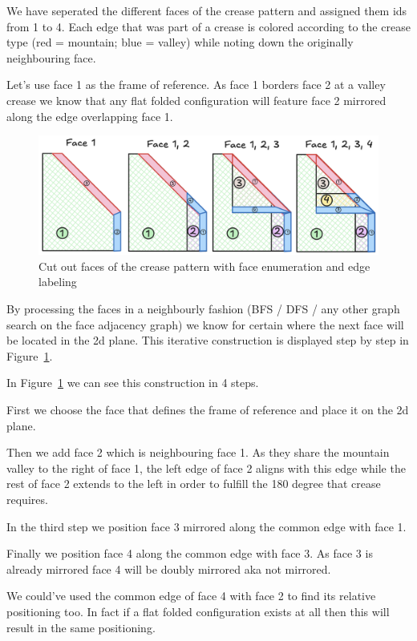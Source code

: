 We have seperated the different faces of the crease pattern and assigned them ids from 1 to 4.
Each edge that was part of a crease is colored according to the crease type (red = mountain; blue = valley) while noting down the originally neighbouring face.

Let's use face 1 as the frame of reference.
As face 1 borders face 2 at a valley crease we know that any flat folded configuration will feature face 2 mirrored along the edge overlapping face 1.

\begin{figure}[h]
\centering
\includegraphics[width=\textwidth]{assets/demo_localflatfold.png}
\caption{Cut out faces of the crease pattern with face enumeration and edge labeling}
\label{fig:demo_localflatfold}
\end{figure}

By processing the faces in a neighbourly fashion (BFS / DFS / any other graph search on the face adjacency graph)
we know for certain where the next face will be located in the 2d plane.
This iterative construction is displayed step by step in Figure~\ref{fig:demo_localflatfold}.

In Figure~\ref{fig:demo_localflatfold} we can see this construction in 4 steps.

First we choose the face that defines the frame of reference and place it on the 2d plane.

Then we add face 2 which is neighbouring face 1. As they share the mountain valley to the right of face 1, the left edge
of face 2 aligns with this edge while the rest of face 2 extends to the left in order to fulfill the 180 degree that crease requires.

In the third step we position face 3 mirrored along the common edge with face 1.

Finally we position face 4 along the common edge with face 3.
As face 3 is already mirrored face 4 will be doubly mirrored aka not mirrored.

We could've used the common edge of face 4 with face 2 to find its relative positioning too.
In fact if a flat folded configuration exists at all then this will result in the same positioning.


